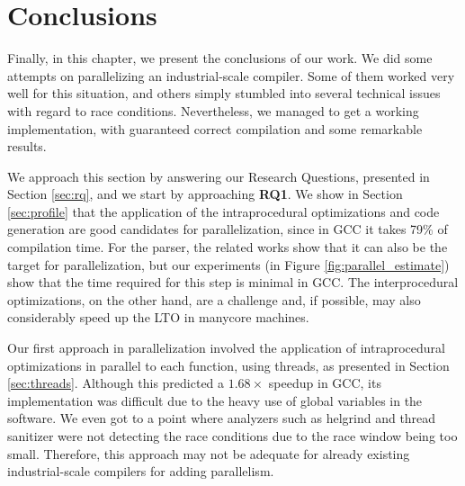 \chapter{Conclusions}
\label{chap:conclusions}

Finally, in this chapter, we present the conclusions of our work. We did some
attempts on parallelizing an industrial-scale compiler. Some of them
worked very well for this situation, and others simply stumbled into several
technical issues with regard to race conditions.
Nevertheless, we managed to get a working implementation, with guaranteed
correct compilation and some remarkable results.

We approach this section by answering our Research Questions, presented in
Section \ref{sec:rq}, and we start by approaching \textbf{RQ1}. We show in
Section \ref{sec:profile} that the application of the intraprocedural
optimizations and code generation are good candidates for parallelization, since
in GCC it takes 79\% of compilation time.  For the parser, the related works
show that it can also be the target for parallelization, but our
experiments (in Figure \ref{fig:parallel_estimate}) show that the time required
for this step is minimal in GCC. The interprocedural optimizations, on the
other hand, are a challenge and, if possible, may also considerably speed up the
LTO in manycore machines. 


Our first approach in parallelization involved the application of intraprocedural
optimizations in parallel to each function, using threads, as presented in
Section \ref{sec:threads}. Although this
predicted a $1.68\times$ speedup in GCC, its implementation was
difficult due to the heavy use of global variables in the software.  We
even got to a point where analyzers such as helgrind and thread sanitizer were
not detecting the race conditions due to the race window being too small.
Therefore, this approach may not be adequate for already existing
industrial-scale compilers for adding parallelism.

